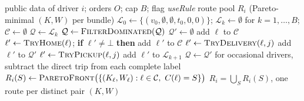 \begin{algorithm}[!htbp]
\caption{\textsc{GenerateRoutes}$(i)$: Algorithm A for one driver}
\label{alg:routegen}
\begin{algorithmic}[1]
\Require public data of driver $i$; orders $O$; cap $B$; flag \textit{useRule}
\Ensure route pool $R_i$ (Pareto-minimal $(K,W)$ per bundle)
\State $\mathcal L_0\gets\{(v_0,\emptyset,\emptyset,t_0,0,0)\}$; $\mathcal L_k\gets\emptyset$ for $k=1,\dots,B$; $\mathcal C\gets\emptyset$
 
  \State $\mathcal Q\gets\mathcal L_k$
    \State $\mathcal Q\gets\textsc{FilterDominated}(\mathcal Q)$ 
    \State $\mathcal Q'\gets\emptyset$
        \State add $\ell$ to $\mathcal C$ 
      \EndIf
        \State $\ell'\gets\textsc{TryHome}(\ell)$; \textbf{if} $\ell'\ne\bot$ \textbf{then} add $\ell'$ to $\mathcal C$ 
      \EndIf
        \State $\ell'\gets\textsc{TryDelivery}(\ell,j)$
         add $\ell'$ to $\mathcal Q'$ \EndIf
      \EndFor
          \State $\ell'\gets\textsc{TryPickup}(\ell,j)$
           add $\ell'$ to $\mathcal L_{k+1}$ \EndIf
        \EndFor
      \EndIf
    \EndFor
    \State $\mathcal Q\gets\mathcal Q'$ 
  \EndWhile
\EndFor
\State for occasional drivers, subtract the direct trip from each complete label
  \State $R_i(S)\gets\textsc{ParetoFront}\bigl(\{(K_\ell,W_\ell):\ell\in\mathcal C,\ C(\ell)=S\}\bigr)$ 
\EndFor
\State \Return $R_i=\bigcup_S R_i(S)$, one route per distinct pair $(K,W)$
\end{algorithmic}
\end{algorithm}

